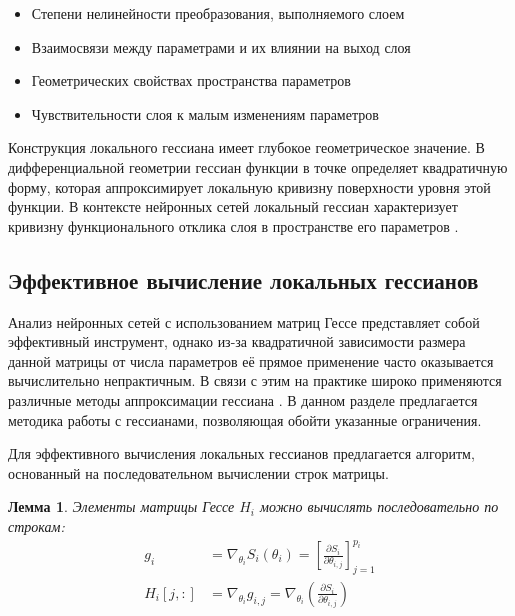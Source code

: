 \documentclass[a4paper,12pt]{article}
\newtheorem{lemma}{Лемма}
\begin{document}
\begin{itemize}
  \item Степени нелинейности преобразования, выполняемого слоем
  \item Взаимосвязи между параметрами и их влиянии на выход слоя
  \item Геометрических свойствах пространства параметров
  \item Чувствительности слоя к малым изменениям параметров
\end{itemize}

Конструкция локального гессиана имеет глубокое геометрическое значение. В дифференциальной геометрии гессиан
функции в точке определяет квадратичную форму, которая аппроксимирует локальную кривизну поверхности уровня
этой функции. В контексте нейронных сетей локальный гессиан характеризует кривизну функционального отклика
слоя в пространстве его параметров \cite{dangel2019modular}.

\subsection{Эффективное вычисление локальных гессианов}

Анализ нейронных сетей с использованием матриц Гессе представляет собой эффективный инструмент, однако из-за
квадратичной зависимости размера данной матрицы от числа параметров её прямое применение часто оказывается
вычислительно непрактичным. В связи с этим на практике широко применяются различные методы аппроксимации
гессиана \cite{carlon2024, hare2024, martens2010, nocedal1980}. В данном разделе предлагается методика работы
с гессианами, позволяющая обойти указанные ограничения.

Для эффективного вычисления локальных гессианов предлагается алгоритм, основанный на последовательном
вычислении строк матрицы.

\begin{lemma}
  Элементы матрицы Гессе $H_i$ можно вычислять последовательно по строкам:
  \begin{equation}
    \begin{aligned}
      g_i &= \nabla_{\theta_i} S_i(\theta_i) = \left[ \frac{\partial S_i}{\partial \theta_{i,j}} \right]_{j=1}^{p_i} \\
      H_i[j,:] &= \nabla_{\theta_i} g_{i,j} = \nabla_{\theta_i} \left( \frac{\partial S_i}{\partial
      \theta_{i,j}} \right)
    \end{aligned}
  \end{equation}
\end{lemma}
\end{document}
